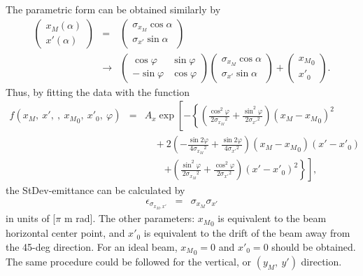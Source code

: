 \documentclass{article}
\begin{document}
The parametric form can be obtained similarly by
\begin{eqnarray*}
\left(
\begin{array}{c}
	x_M (\alpha) \\
	x' (\alpha)
\end{array} \right) & = & \left(
\begin{array}{c}
	\sigma_{x_M} \cos{\alpha} \\
	\sigma_{x'} \sin{\alpha}
\end{array} \right) \\
& \rightarrow & \left(
\begin{array}{cc}
	\cos{\varphi} & \sin{\varphi} \\
	-\sin{\varphi} & \cos{\varphi}
\end{array} \right) \left(
\begin{array}{c}
	\sigma_{x_M} \cos{\alpha} \\
	\sigma_{x'} \sin{\alpha}
\end{array} \right) + \left(
\begin{array}{c}
	{x_M}_0 \\
	{x'}_0
\end{array} \right).
\end{eqnarray*}
Thus, by fitting the data with the function 
\begin{eqnarray*}
f\left(x_M,\ x',\ ,\ {x_M}_0,\ {x'}_0,\ \varphi\right) & = & A_x \exp \left[ -\left\{ \left( \frac{\cos^2{\varphi}}{2{\sigma_{x_M}}^2} + \frac{\sin^2{\varphi}}{2{\sigma_{x'}}^2} \right) \left( x_M-{x_M}_0 \right)^2 \right. \right. \\
& & \, \, \, \, \, \, + 2 \left( -\frac{\sin{2\varphi}}{4{\sigma_{x_M}}^2} + \frac{\sin{2\varphi}}{4{\sigma_{x'}}^2} \right) \left( x_M-{x_M}_0 \right) \left( x'-{x'}_0 \right) \\
& & \, \, \, \, \, \, \, \, \, \, \, \, \left. \left. + \left( \frac{\sin^2{\varphi}}{2{\sigma_{x_M}}^2} + \frac{\cos^2{\varphi}}{2{\sigma_{x'}}^2} \right) \left( x'-{x'}_0 \right)^2 \right\} \right],
\end{eqnarray*}
the StDev-emittance can be calculated by
\begin{eqnarray*}
\epsilon_{\sigma_{x_M,x'}} & = & \sigma_{x_M} \sigma_{x'}
\end{eqnarray*}
in units of [$\pi$ m rad]. The other parameters: ${x_M}_0$ is equivalent to the beam horizontal center point, and ${x'}_0$ is equivalent to the drift of the beam away from the 45-deg direction. For an ideal beam, ${x_M}_0 = 0$ and ${x'}_0 = 0$ should be obtained. The same procedure could be followed for the vertical, or $\left(y_M,\ y'\right)$ direction.
\end{document}
